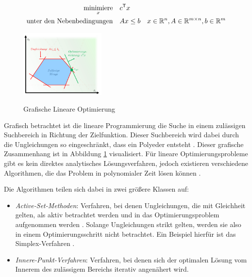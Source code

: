 \vspace*{-0.2cm}
\begin{align}
    \label{eqn:linear-programming}
    \minimize_{x}                     & \quad c^\mathsf{T} x                                                                                                    \\
    \text{unter den Nebenbedingungen} & \quad Ax \leq b      & x \in \mathbb{R}^{n}, A \in \mathbb{R}^{m\times n}, b \in \mathbb{R}^{m} \vspace*{-0.2cm} \notag
\end{align}

\begin{figure}
    \centering
    \vspace*{-0.75cm}
    \includegraphics[width=0.38\textwidth]{res/pictures/linear-programming.png}
    \caption[Grafische Lineare Optimierung]{\unskip}
    Grafische Lineare Optimierung
    \label{fig:linear-programming}
    \vspace*{-0.75cm}
\end{figure}

Grafisch betrachtet ist die lineare Programmierung die Suche in einem zulässigen Suchbereich in Richtung der Zielfunktion. Dieser Suchbereich wird dabei durch die Ungleichungen so eingeschränkt, dass ein Polyeder entsteht \cite[S. 31]{2023.ConvexOptimization}. Dieser grafische Zusammenhang ist in Abbildung \ref{fig:linear-programming} visualisiert. Für lineare Optimierungsprobleme gibt es kein direktes analytisches Lösungsverfahren, jedoch existieren verschiedene Algorithmen, die das Problem in polynomialer Zeit lösen können \cite[S. 6]{2023.ConvexOptimization}.

Die Algorithmen teilen sich dabei in zwei größere Klassen auf:

\begin{itemize}
    \item \emph{Active-Set-Methoden}: Verfahren, bei denen Ungleichungen, die mit Gleichheit gelten, als aktiv betrachtet werden und in das Optimierungsproblem aufgenommen werden \cite[S. 243]{2023.OptimizationLectureNotes}. Solange Ungleichungen strikt gelten, werden sie also in einem Optimierungsschritt nicht betrachtet. Ein Beispiel hierfür ist das Simplex-Verfahren \cite[S. 248]{2023.OptimizationLectureNotes}.
    \item \emph{Innere-Punkt-Verfahren}: Verfahren, bei denen sich der optimalen Lösung vom Innerem des zulässigem Bereichs iterativ angenähert wird. \cite[S. 261]{2023.InteriorPoint}
\end{itemize}

